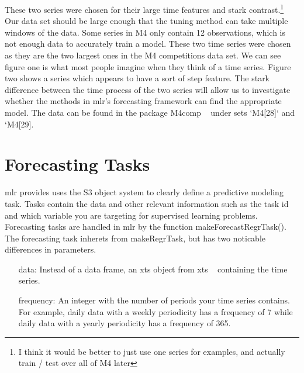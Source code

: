 \documentclass{article}\usepackage[]{graphicx}\usepackage[]{color}
\makeatletter
\theoremstyle{definition}
\newcommand\code{\@codex}
\def\@codex#1{{\normalfont\ttfamily\hyphenchar\font=-1 #1}}
\newcommand{\pkg}[1]{{\fontseries{b}\selectfont #1}}
\makeatother
\begin{document}
These two series were chosen for their large time features and stark contrast.\footnote{I think it would be better to just use one series for examples, and actually train / test over all of M4 later} Our data set should be large enough that the tuning method can take multiple windows of the data. Some series in M4 only contain 12 observations, which is not enough data to accurately train a model. These two time series were chosen as they are the two largest ones in the M4 competitions data set. We can see figure one is what most people imagine when they think of a time series. Figure two shows a series which appears to have a sort of step feature. The stark difference between the time process of the two series will allow us to investigate whether the methods in \pkg{mlr}'s forecasting framework can find the appropriate model. The data can be found in the package \pkg{M4comp} ~\cite{m4comp} under sets `M4[28]` and `M4[29]. 

\section{Forecasting Tasks}
\label{sec:task}

\pkg{mlr} provides uses the S3 object system to clearly define a predictive modeling task. Tasks contain the data and other relevant information such as the task id and which variable you are targeting for supervised learning problems. Forecasting tasks are handled in \pkg{mlr} by the function \code{makeForecastRegrTask()}. The forecasting task inherets from \code{makeRegrTask}, but has two noticable differences in parameters.

\begin{itemize}
\item[data:] Instead of a data frame, an xts object from \pkg{xts} ~\cite{xts} containing the time series.
\item[frequency:] An integer with the number of periods your time series contains. For example, daily data with a weekly periodicity has a frequency of 7 while daily data with a yearly periodicity has a frequency of 365.
\end{itemize}
\end{document}
